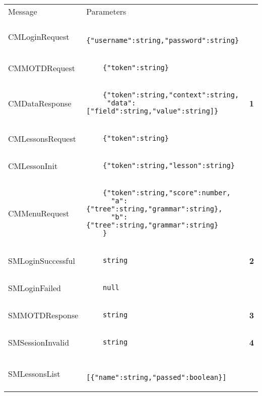 \documentclass{scrartcl}
\begin{document}
\begin{tabular}{lll}
  Message & Parameters \\
  CMLoginRequest &
  \begin{lstlisting}
    {"username":string,"password":string}
  \end{lstlisting} \\
  CMMOTDRequest &
  \begin{lstlisting}
    {"token":string}
  \end{lstlisting} \\
  CMDataResponse &
  \begin{lstlisting}
    {"token":string,"context":string,
     "data":["field":string,"value":string]}
  \end{lstlisting} & {\bfseries\footnotesize 1} \\
  CMLessonsRequest &
  \begin{lstlisting}
    {"token":string}
  \end{lstlisting} \\
  CMLessonInit &
  \begin{lstlisting}
    {"token":string,"lesson":string}
  \end{lstlisting} \\
  CMMenuRequest &
  \begin{lstlisting}
    {"token":string,"score":number,
      "a":{"tree":string,"grammar":string},
      "b":{"tree":string,"grammar":string}
    }
  \end{lstlisting} \\
  SMLoginSuccessful &
  \begin{lstlisting}
    string
  \end{lstlisting} & {\bfseries\footnotesize 2} \\
  SMLoginFailed &
  \begin{lstlisting}
    null
  \end{lstlisting} \\
  SMMOTDResponse &
  \begin{lstlisting}
    string
  \end{lstlisting} & {\bfseries\footnotesize 3} \\
  SMSessionInvalid &
  \begin{lstlisting}
    string
  \end{lstlisting} & {\bfseries\footnotesize 4} \\
  SMLessonsList &
  \begin{lstlisting}
    [{"name":string,"passed":boolean}]
  \end{lstlisting} \\

\end{tabular}
\end{document}
